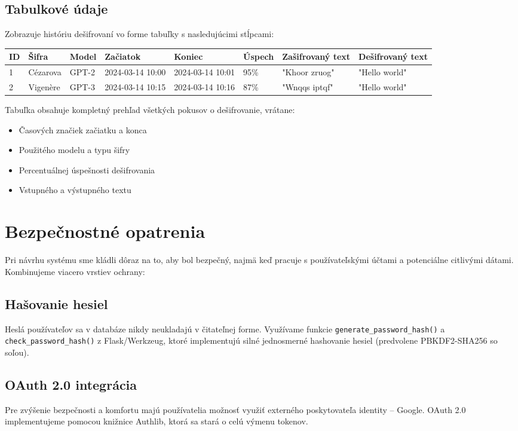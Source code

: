 \documentclass[12pt,a4paper]{article}
\begin{document}
\subsection{Tabulkové údaje}
Zobrazuje históriu dešifrovaní vo forme tabuľky s nasledujúcimi stĺpcami:

\begin{longtable}{p{}p{}p{}p{}p{}p{}p{}p{}}
\toprule
\textbf{ID} & \textbf{Šifra} & \textbf{Model} & \textbf{Začiatok} & \textbf{Koniec} & \textbf{Úspech} & \textbf{Zašifrovaný text} & \textbf{Dešifrovaný text} \\
\midrule
\endhead
1 & Cézarova & GPT-2 & 2024-03-14 10:00 & 2024-03-14 10:01 & 95\% & "Khoor zruog" & "Hello world" \\
2 & Vigenère & GPT-3 & 2024-03-14 10:15 & 2024-03-14 10:16 & 87\% & "Wnqqs iptqf" & "Hello world" \\
\bottomrule
\end{longtable}

Tabuľka obsahuje kompletný prehľad všetkých pokusov o dešifrovanie, vrátane:
\begin{itemize}
    \item Časových značiek začiatku a konca
    \item Použitého modelu a typu šifry
    \item Percentuálnej úspešnosti dešifrovania
    \item Vstupného a výstupného textu
\end{itemize}

\section{Bezpečnostné opatrenia}
Pri návrhu systému sme kládli dôraz na to, aby bol bezpečný, najmä keď pracuje s používateľskými účtami a potenciálne citlivými dátami. Kombinujeme viacero vrstiev ochrany:

\subsection{Hašovanie hesiel}
Heslá používateľov sa v databáze nikdy neukladajú v čitateľnej forme. Využívame funkcie \texttt{generate\_password\_hash()} a \texttt{check\_password\_hash()} z Flask/Werkzeug, ktoré implementujú silné jednosmerné hashovanie hesiel (predvolene PBKDF2-SHA256 so soľou).

\subsection{OAuth 2.0 integrácia}
Pre zvýšenie bezpečnosti a komfortu majú používatelia možnosť využiť externého poskytovateľa identity -- Google. OAuth 2.0 implementujeme pomocou knižnice Authlib, ktorá sa stará o celú výmenu tokenov.
\end{document}
